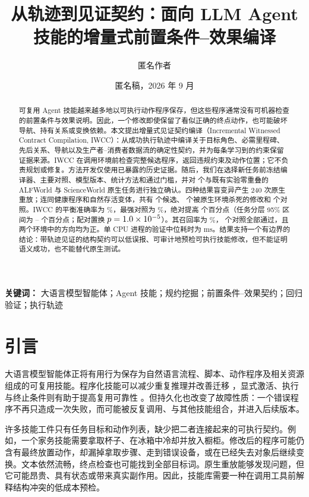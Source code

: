 \documentclass[10pt]{article}
\title{从轨迹到见证契约：面向 LLM Agent 技能的增量式前置条件--效果编译}
\author{匿名作者}
\date{匿名稿，2026 年 9 月}
\begin{document}
\maketitle

\begin{abstract}
可复用 Agent 技能越来越多地以可执行动作程序保存，但这些程序通常没有可机器检查的前置条件与效果说明。因此，一个修改即使保留了看似正确的终点动作，也可能破坏导航、持有关系或变换依赖。本文提出增量式见证契约编译（Incremental Witnessed Contract Compilation, IWCC）：从成功执行轨迹中编译关于目标角色、必需里程碑、先后关系、导航以及生产者--消费者数据流的确定性契约，并为每条学习到的约束保留证据来源。IWCC 在调用环境前检查完整候选程序，返回违规约束及动作位置；它不负责规划或修复。方法开发仅使用已暴露的历史证据。随后，我们在选择新任务前冻结编译器、主要对照、模型版本、统计方法和通过门槛，并对 \TaskCount{} 个与既有实验零重叠的 ALFWorld 与 ScienceWorld 原生任务进行独立确认。四种结果盲变异产生 240 次原生重放；连同健康程序和自然存活变体，共有 \CandidateCount{} 个候选、\KilledCount{} 个被原生环境杀死的修改和 \ControlCount{} 个对照。IWCC 的平衡准确率为 \IWCCBA\%，最强对照为 \EndpointBA\%，绝对提高 \GainPoints{} 个百分点（任务分层 95\% 区间为 \GainCILow--\GainCIHigh{} 个百分点；配对置换 $p=1.0\times10^{-5}$）。其召回率为 \IWCCRecall\%，\ControlCount{} 个对照全部通过，且两个环境中的方向均为正。单 CPU 进程的验证中位耗时为 \MedianRuntime{} ms。结果支持一个有边界的结论：带轨迹见证的结构契约可以低误报、可审计地预检可执行技能修改，但不能证明语义成功，也不能替代原生测试。
\end{abstract}

\noindent\textbf{关键词：} 大语言模型智能体；Agent 技能；规约挖掘；前置条件--效果契约；回归验证；执行轨迹

\section{引言}
大语言模型智能体正将有用行为保存为自然语言流程、脚本、动作程序及相关资源组成的可复用技能。程序化技能可以减少重复推理并改善迁移 \citep{wang2025asi,guo2026skilldisco}，显式激活、执行与终止条件则有助于提高复用可靠性 \citep{mi2026skillpro}。但持久化也改变了故障性质：一个错误程序不再只造成一次失败，而可能被反复调用、与其他技能组合，并进入后续版本。

许多技能工件只有任务目标和动作列表，缺少把二者连接起来的可执行契约。例如，一个家务技能需要拿取杯子、在冰箱中冷却并放入橱柜。修改后的程序可能仍含有最终放置动作，却漏掉拿取步骤、走到错误设备，或在已经失去对象后继续变换。文本依然流畅，终点检查也可能找到全部目标词。原生重放能够发现问题，但它可能昂贵、具有状态或带来真实副作用。因此，技能库需要一种在调用工具前解释结构冲突的低成本预检。
\end{document}
